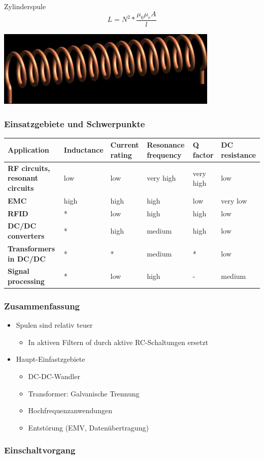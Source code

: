 \\
\begin{minipage}{9cm}
Zylinderspule\\
\begin{equation}
L=N^2*\frac{\mu_{0}\mu_{r}A}{l}
\end{equation}
\end{minipage}
\begin{minipage}{9cm}
\includegraphics[scale=0.4]{pictures/zylinderspule}
\end{minipage}

\subsubsection{Einsatzgebiete und Schwerpunkte}
\begin{longtable}{|p{3.5cm}|l|l|l|l|l|}
\hline
\textbf{Application}&Inductance&Current rating&Resonance frequency&Q factor&DC
resistance\\
\hline
\textbf{RF circuits, resonant circuits}&low&low&very high&very high&low\\
\hline
\textbf{EMC}&high&high&high&low&very low\\
\hline
\textbf{RFID}&*&low&high&high&low\\
\hline
\textbf{DC/DC converters}&*&high&medium&high&low\\
\hline
\textbf{Transformers in DC/DC}&*&*&medium&*&low\\
\hline
\textbf{Signal processing}&*&low&high&-&medium\\
\hline
\end{longtable}

\subsubsection{Zusammenfassung}
\begin{itemize}
  \item Spulen sind relativ teuer
  \begin{itemize}
    \item In aktiven Filtern of durch aktive RC-Schaltungen ersetzt
  \end{itemize}
  \item Haupt-Einfastzgebiete
  \begin{itemize}
    \item DC-DC-Wandler
    \item Transformer: Galvanische Trennung
    \item Hochfrequenzanwendungen
    \item Entstörung (EMV, Datenübertragung)
  \end{itemize}
\end{itemize}

\subsubsection{Einschaltvorgang}



